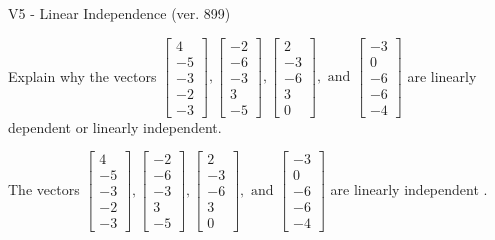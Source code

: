\begin{exercise}
  \begin{exerciseTitle}V5 - Linear Independence (ver. 899)\end{exerciseTitle}
  \begin{exerciseStatement}
    Explain why the vectors \(\left[\begin{array}{r}
4 \\
-5 \\
-3 \\
-2 \\
-3
\end{array}\right] , \left[\begin{array}{r}
-2 \\
-6 \\
-3 \\
3 \\
-5
\end{array}\right] , \left[\begin{array}{r}
2 \\
-3 \\
-6 \\
3 \\
0
\end{array}\right] , \text{ and } \left[\begin{array}{r}
-3 \\
0 \\
-6 \\
-6 \\
-4
\end{array}\right]\) are linearly dependent or linearly independent.	


  \end{exerciseStatement}
  \begin{exerciseAnswer}
   The vectors \(\left[\begin{array}{r}
4 \\
-5 \\
-3 \\
-2 \\
-3
\end{array}\right] , \left[\begin{array}{r}
-2 \\
-6 \\
-3 \\
3 \\
-5
\end{array}\right] , \left[\begin{array}{r}
2 \\
-3 \\
-6 \\
3 \\
0
\end{array}\right] , \text{ and } \left[\begin{array}{r}
-3 \\
0 \\
-6 \\
-6 \\
-4
\end{array}\right]\) are 
  	 linearly independent  .
  


  \end{exerciseAnswer}
\end{exercise}
